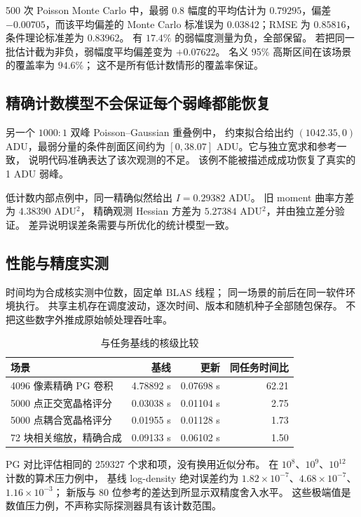 \documentclass[UTF8,11pt,a4paper,fontset=fandol]{ctexart}
\newcommand{\ScaleSpeed}{1.50}
\begin{document}
500 次 Poisson Monte Carlo 中，最弱 $0.8$ 幅度的平均估计为
$0.79295$，偏差 $-0.00705$，而该平均偏差的 Monte Carlo 标准误为
$0.03842$；RMSE 为 $0.85816$，条件理论标准差为 $0.83962$。
有 $17.4\%$ 的弱幅度测量为负，全部保留。
若把同一批估计截为非负，弱幅度平均偏差变为 $+0.07622$。
名义 95\% 高斯区间在该场景的覆盖率为 $94.6\%$；
这不是所有低计数情形的覆盖率保证。

\subsection{精确计数模型不会保证每个弱峰都能恢复}

另一个 $1000{:}1$ 双峰 Poisson--Gaussian 重叠例中，
约束拟合给出约 $(1042.35,0)$ ADU，最弱分量的条件剖面区间约为
$[0,38.07]$ ADU。它与独立宽求和参考一致，
说明代码准确表达了该次观测的不足。
该例不能被描述成成功恢复了真实的 1 ADU 弱峰。

低计数内部点例中，同一精确似然给出 $I=0.29382$ ADU。
旧 moment 曲率方差为 $4.38390$ ADU$^2$，
精确观测 Hessian 方差为 $5.27384$ ADU$^2$，并由独立差分验证。
差异说明误差条需要与所优化的统计模型一致。

\subsection{性能与精度实测}

时间均为合成核实测中位数，固定单 BLAS 线程；
同一场景的前后在同一软件环境执行。
共享主机存在调度波动，逐次时间、版本和随机种子全部随包保存。
不把这些数字外推成原始帧处理吞吐率。

\begin{table}[htbp]
\centering\small
\caption{与任务基线的核级比较}\label{tab:performance}
\begin{tabularx}{\textwidth}{@{}Xrrr@{}}
\toprule
场景 & 基线 & 更新 & 同任务时间比\\
\midrule
4096 像素精确 PG 卷积 & 4.78892 s & 0.07698 s & 62.21\\
5000 点正交宽晶格评分 & 0.03038 s & 0.01104 s & 2.75\\
5000 点耦合宽晶格评分 & 0.01955 s & 0.01128 s & 1.73\\
72 块相关缩放，精确合成 & 0.09133 s & 0.06102 s & \ScaleSpeed\\
\bottomrule
\end{tabularx}
\end{table}

PG 对比评估相同的 259327 个求和项，没有换用近似分布。
在 $10^8$、$10^9$、$10^{12}$ 计数的算术压力例中，
基线 log-density 绝对误差约为
$1.82\times10^{-7}$、$4.68\times10^{-7}$、$1.16\times10^{-3}$；
新版与 80 位参考的差达到所显示双精度舍入水平。
这些极端值是数值压力例，不声称实际探测器具有该计数范围。
\end{document}
